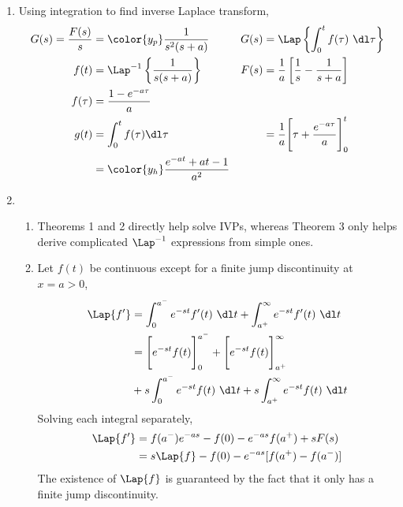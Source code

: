 \begin{enumerate}
    \item Using integration to find inverse Laplace transform,
          \begin{align}
              G(s) = \frac{F(s)}{s} & = \color{y_p} \frac{1}{s^2(s + a)}         &
              G(s)                  & = \Lap\left\{ \int_{0}^{t}f(\tau)
              \ \dl \tau \right\}                                                  \\
              f(t)                  & = \Lap^{-1}\left\{ \frac{1}
              {s(s + a)} \right\}   &
              F(s)                  & = \frac{1}{a}\left[ \frac{1}{s}
              - \frac{1}{s+a} \right]                                              \\
              f(\tau)               & = \frac{1 - e^{-a\tau}}{a}                   \\
              g(t)                  & = \int_{0}^{t}
              f(\tau) \dl \tau      &
                                    & = \frac{1}{a} \Bigg[ \tau
              + \frac{e^{-a\tau}}{a} \Bigg]_0^t                                    \\
                                    & = \color{y_h} \frac{e^{-at} + at - 1}{a^2}
          \end{align}

    \item
          \begin{enumerate}
              \item Theorems 1 and 2 directly help solve IVPs, whereas Theorem 3 only
                    helps derive complicated $ \Lap^{-1} $ expressions from simple ones.
              \item Let $ f(t) $ be continuous except for a finite jump discontinuity
                    at $ x = a > 0 $,
                    \begin{align}
                        \Lap\{f'\} & = \int_{0}^{a^-} e^{-st}f'(t)\ \dl t
                        + \int_{a^+}^{\infty} e^{-st}f'(t)\ \dl t         \\
                                   & = \Bigg[e^{-st}f(t)\Bigg]_0^{a^-}
                        + \Bigg[e^{-st}f(t)\Bigg]_{a^+}^{\infty}          \\
                                   & + s\int_{0}^{a^-} e^{-st}f(t)\ \dl t
                        + s\int_{a^+}^{\infty} e^{-st}f(t)\ \dl t
                    \end{align}
                    Solving each integral separately,
                    \begin{align}
                        \Lap\{f'\} & = f(a^-)e^{-as} - f(0) - e^{-as}f(a^+) + sF(s)    \\
                                   & = s\Lap\{f\} - f(0) - e^{-as} [f(a^+) - f(a^{-})]
                    \end{align}
                    The existence of $ \Lap\{f\} $ is guaranteed by the fact that it only
                    has a finite jump discontinuity.


\end{enumerate}
\end{enumerate}
